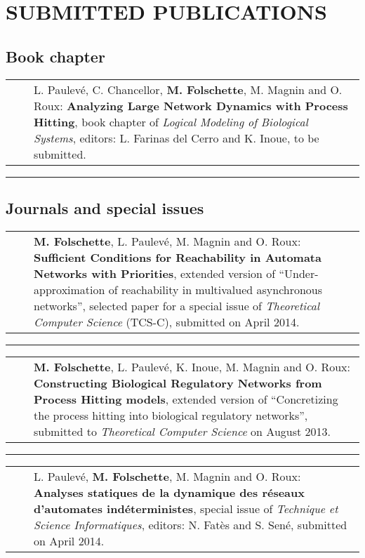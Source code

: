 \documentclass[11pt,a4paper,sans]{moderncv} %
\makeatletter
\renewcommand{\emph}{\textbf}
\newcommand{\myrule}{\vspace*{-2pt}\textcolor{color3}{\rule{\textwidth}{.5pt}}\vspace*{1pt}}
\newcommand{\mybluerule}{\vspace*{5pt}\textcolor{color1}{\rule{\textwidth}{.5pt}}\vspace*{-2pt}}
\newlength{\listitemsymbolwidthsep}
\newenvironment{publist}%
{\begin{tabular}{r@{}p{.935\textwidth}}\hspace{-\listitemsymbolwidthsep}\hspace{.45\hintscolumnwidth}}%
{\end{tabular}}
\newcommand{\newpub}[1]{\vspace{1pt}\begin{publist}\listitemsymbol~~&#1\end{publist}\vspace{1pt}}
\newcommand{\cvsectionvspace}{\vspace{.4cm}}
\newenvironment{cvsplitsection}[1]{%
  \cvsectionvspace
  \section{#1}%
}{}
\newenvironment{cvsubsection}[1]{%
  \vspace*{4pt}
  \begin{minipage}{\textwidth}
  \subsection{#1}%
}{%
  \end{minipage}
}
\newenvironment{cvsubsectionrule}[1]{%
  \begin{minipage}{\textwidth}
  \mybluerule
  \subsection{#1}%
}{%
  \end{minipage}
}
\makeatother
\begin{document}
\begin{cvsplitsection}{SUBMITTED PUBLICATIONS}

\begin{cvsubsection}{Book chapter}

\newpub{L. Paulevé, C. Chancellor, \emph{M. Folschette}, M. Magnin and O. Roux:
  \emph{Analyzing Large Network Dynamics with Process Hitting},
  book chapter of \textit{Logical Modeling of Biological Systems},
  editors: L. Farinas del Cerro and K. Inoue,
  to be submitted.}

\end{cvsubsection}



\begin{cvsubsectionrule}{Journals and special issues}

\newpub{\emph{M. Folschette}, L. Paulevé, M. Magnin and O. Roux:
  \emph{Sufficient Conditions for Reachability in Automata Networks with Priorities},
  extended version of “Under-approximation of reachability in multivalued asynchronous networks”,
  selected paper for a special issue of \textit{Theoretical Computer Science} (TCS-C),
  submitted on April 2014.}

\myrule

\newpub{\emph{M. Folschette}, L. Paulevé, K. Inoue, M. Magnin and O. Roux:
  \emph{Constructing Biological Regulatory Networks from Process Hitting models},
  extended version of “Concretizing the process hitting into biological regulatory networks”,
  submitted to \textit{Theoretical Computer Science} on August 2013.}

\myrule

\newpub{L. Paulevé, \emph{M. Folschette}, M. Magnin and O. Roux:
  \emph{Analyses statiques de la dynamique des réseaux d’automates indéterministes},
  special issue of \textit{Technique et Science Informatiques},
  editors: N. Fatès and S. Sené,
  submitted on April 2014.}

\end{cvsubsectionrule}

\end{cvsplitsection}
\end{document}
